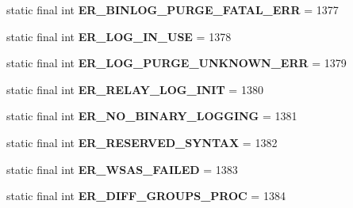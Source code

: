 \begin{DoxyCompactItemize}
static final int {\bfseries E\+R\+\_\+\+B\+I\+N\+L\+O\+G\+\_\+\+P\+U\+R\+G\+E\+\_\+\+F\+A\+T\+A\+L\+\_\+\+E\+RR} = 1377
\item 
\mbox{\label{classcom_1_1mysql_1_1cj_1_1exceptions_1_1_mysql_error_numbers_a592400642b6b83162ec8cdce7b4e1274}} 
static final int {\bfseries E\+R\+\_\+\+L\+O\+G\+\_\+\+I\+N\+\_\+\+U\+SE} = 1378
\item 
\mbox{\label{classcom_1_1mysql_1_1cj_1_1exceptions_1_1_mysql_error_numbers_ae970cfca9ce9ad7ac42fd6d99a589dec}} 
static final int {\bfseries E\+R\+\_\+\+L\+O\+G\+\_\+\+P\+U\+R\+G\+E\+\_\+\+U\+N\+K\+N\+O\+W\+N\+\_\+\+E\+RR} = 1379
\item 
\mbox{\label{classcom_1_1mysql_1_1cj_1_1exceptions_1_1_mysql_error_numbers_aafbc12ce5a49c20322530eee99dc8950}} 
static final int {\bfseries E\+R\+\_\+\+R\+E\+L\+A\+Y\+\_\+\+L\+O\+G\+\_\+\+I\+N\+IT} = 1380
\item 
\mbox{\label{classcom_1_1mysql_1_1cj_1_1exceptions_1_1_mysql_error_numbers_aabef7b65d4d55027811637a4f6892921}} 
static final int {\bfseries E\+R\+\_\+\+N\+O\+\_\+\+B\+I\+N\+A\+R\+Y\+\_\+\+L\+O\+G\+G\+I\+NG} = 1381
\item 
\mbox{\label{classcom_1_1mysql_1_1cj_1_1exceptions_1_1_mysql_error_numbers_add66c0e95ba9ef2a9cb00bbcd9e01477}} 
static final int {\bfseries E\+R\+\_\+\+R\+E\+S\+E\+R\+V\+E\+D\+\_\+\+S\+Y\+N\+T\+AX} = 1382
\item 
\mbox{\label{classcom_1_1mysql_1_1cj_1_1exceptions_1_1_mysql_error_numbers_a2d31891021fd77924d0ebd54ef681642}} 
static final int {\bfseries E\+R\+\_\+\+W\+S\+A\+S\+\_\+\+F\+A\+I\+L\+ED} = 1383
\item 
\mbox{\label{classcom_1_1mysql_1_1cj_1_1exceptions_1_1_mysql_error_numbers_a08552aafdf969c68dc0b36ce02104105}} 
static final int {\bfseries E\+R\+\_\+\+D\+I\+F\+F\+\_\+\+G\+R\+O\+U\+P\+S\+\_\+\+P\+R\+OC} = 1384

\end{DoxyCompactItemize}
